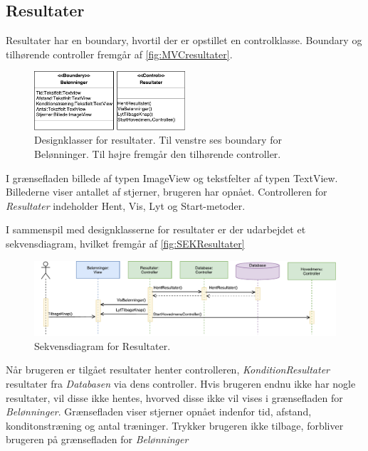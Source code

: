 \subsection*{Resultater}
Resultater har en boundary, hvortil der er opstillet en controlklasse. Boundary og tilhørende controller fremgår af \autoref{fig:MVCresultater}. 

\begin{figure} [H]
\centering
\includegraphics[width=0.5\textwidth]{figures/MVC/MVCResultater}
\caption{Designklasser for resultater. Til venstre ses boundary for Belønninger. Til højre fremgår den tilhørende controller.}
\label{fig:MVCresultater}
\end{figure}

\noindent
I grænsefladen billede af typen ImageView og tekstfelter af typen TextView. Billederne viser antallet af stjerner, brugeren har opnået.
Controlleren for \textit{Resultater} indeholder Hent, Vis, Lyt og Start-metoder. 

I sammenspil med designklasserne for resultater er der udarbejdet et sekvensdiagram, hvilket fremgår af \autoref{fig:SEKResultater}

\begin{figure} [H]
\centering
\includegraphics[width=1\textwidth]{figures/Sek/SEKResultater}
\caption{Sekvensdiagram for Resultater.}
\label{fig:SEKResultater}
\end{figure} 

\noindent 
Når brugeren er tilgået resultater henter controlleren, \textit{KonditionResultater} resultater fra \textit{Databasen} via dens controller. Hvis brugeren endnu ikke har nogle resultater, vil disse ikke hentes, hvorved disse ikke vil vises i grænsefladen for \textit{Belønninger}. Grænsefladen viser stjerner opnået indenfor tid, afstand, konditonstræning og antal træninger. Trykker brugeren ikke tilbage, forbliver brugeren på grænsefladen for \textit{Belønninger}

